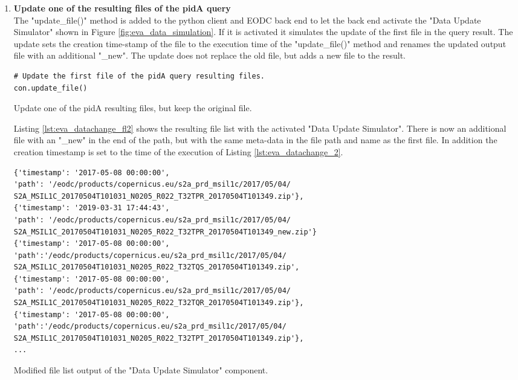 \documentclass[draft,final]{vutinfth} %
\newenvironment{code}{\captionsetup{type=listing}}{}
\begin{document}
\begin{enumerate}
	\setcounter{enumi}{+1}
	\item \textbf{Update one of the resulting files of the pidA query} \\
The "update\_file()" method is added to the python client and EODC back end to let the back end activate the "Data Update Simulator" shown in Figure \ref{fig:eva_data_simulation}. If it is activated it simulates the update of the first file in the query result. The update sets the creation time-stamp of the file to the execution time of the "update\_file()" method and renames the updated output file with an additional "\_new". The update does not replace the old file, but adds a new file to the result. 
	\begin{code}
		\begin{verbatim}
# Update the first file of the pidA query resulting files.
con.update_file()
		\end{verbatim}
		\caption{Update one of the pidA resulting files, but keep the original file.}
		\label{lst:eva_datachange_2}
	\end{code}

Listing \ref{lst:eva_datachange_fl2} shows the resulting file list with the activated "Data Update Simulator". There is now an additional file with an "\_new" in the end of the path, but with the same meta-data in the file path and name as the first file. In addition the creation timestamp is set to the time of the execution of Listing \ref{lst:eva_datachange_2}.

	\begin{code}
	\begin{verbatim}
{'timestamp': '2017-05-08 00:00:00', 
'path': '/eodc/products/copernicus.eu/s2a_prd_msil1c/2017/05/04/
S2A_MSIL1C_20170504T101031_N0205_R022_T32TPR_20170504T101349.zip'}, 
{'timestamp': '2019-03-31 17:44:43', 
'path': '/eodc/products/copernicus.eu/s2a_prd_msil1c/2017/05/04/
S2A_MSIL1C_20170504T101031_N0205_R022_T32TPR_20170504T101349_new.zip'}
{'timestamp': '2017-05-08 00:00:00',
'path':'/eodc/products/copernicus.eu/s2a_prd_msil1c/2017/05/04/
S2A_MSIL1C_20170504T101031_N0205_R022_T32TQS_20170504T101349.zip', 
{'timestamp': '2017-05-08 00:00:00', 
'path': '/eodc/products/copernicus.eu/s2a_prd_msil1c/2017/05/04/
S2A_MSIL1C_20170504T101031_N0205_R022_T32TQR_20170504T101349.zip'}, 
{'timestamp': '2017-05-08 00:00:00',
'path':'/eodc/products/copernicus.eu/s2a_prd_msil1c/2017/05/04/
S2A_MSIL1C_20170504T101031_N0205_R022_T32TPT_20170504T101349.zip'},
...
 	\end{verbatim}
	\caption{Modified file list output of the "Data Update Simulator" component.}
	\label{lst:eva_datachange_fl2}
\end{code}
	

\end{enumerate}
\end{document}
